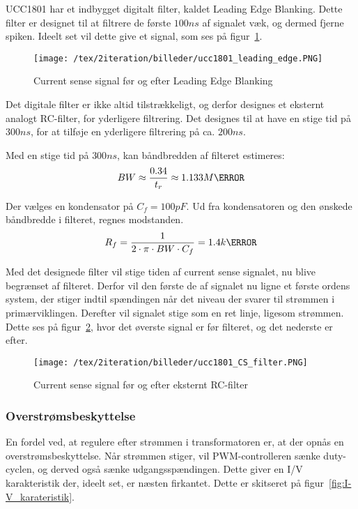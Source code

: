 UCC1801 har et indbygget digitalt filter, kaldet Leading Edge Blanking. Dette filter er designet til at filtrere de første $100ns$ af signalet væk, og dermed fjerne spiken. Ideelt set vil dette give et signal, som ses på figur~\ref{fig:ucc1801_leading_edge}.

\begin{figure}[H]
	\center
	\texttt{[image: /tex/2iteration/billeder/ucc1801\_leading\_edge.PNG]}
	\caption{Current sense signal før og efter Leading Edge Blanking}
	\label{fig:ucc1801_leading_edge}
\end{figure}

Det digitale filter er ikke altid tilstrækkeligt, og derfor designes et eksternt analogt RC-filter, for yderligere filtrering. Det designes til at have en stige tid på $300ns$, for at tilføje en yderligere filtrering på ca. $200ns$. 

\noindent Med en stige tid på $300ns$, kan båndbredden af filteret estimeres:
\begin{equation} \label{filter_BW}
BW \approx \frac{0.34}{t_r} \approx 1.133M\hertz
\end{equation}

\noindent Der vælges en kondensator på $C_f=100pF$. Ud fra kondensatoren og den ønskede båndbredde i filteret, regnes modstanden.
\begin{equation} \label{filter_R}
R_f = \frac{1}{2 \cdot \pi \cdot BW \cdot C_f} = 1.4k\ohm
\end{equation}

Med det designede filter vil stige tiden af current sense signalet, nu blive begrænset af filteret. Derfor vil den første de af signalet nu ligne et første ordens system, der stiger indtil spændingen når det niveau der svarer til strømmen i primærviklingen. Derefter vil signalet stige som en ret linje, ligesom strømmen. Dette ses på figur~\ref{fig:ucc1801_CS_filter}, hvor det øverste signal er før filteret, og det nederste er efter.

\begin{figure}[H]
	\center
	\texttt{[image: /tex/2iteration/billeder/ucc1801\_CS\_filter.PNG]}
	\caption{Current sense signal før og efter eksternt RC-filter}
	\label{fig:ucc1801_CS_filter}
\end{figure}

\subsubsection{Overstrømsbeskyttelse} \label{CS_protection}
En fordel ved, at regulere efter strømmen i transformatoren er, at der opnås en overstrømsbeskyttelse. Når strømmen stiger, vil PWM-controlleren sænke duty-cyclen, og derved også sænke udgangsspændingen. Dette giver en I/V karakteristik der, ideelt set, er næsten firkantet. Dette er skitseret på figur~\ref{fig:I-V_karateristik}. 

